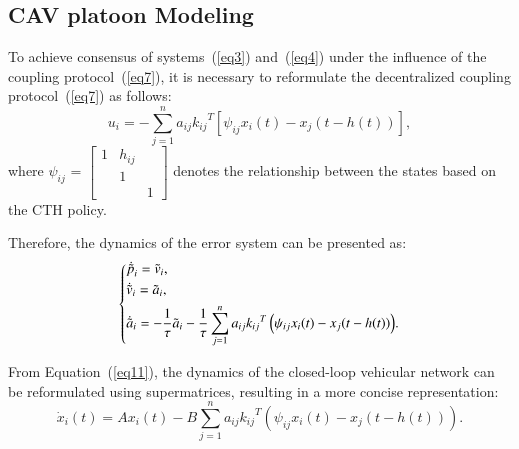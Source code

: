 \documentclass[journal]{IEEEtran}
\begin{document}
\subsection{CAV platoon Modeling}
\label{Section 3.2}

To achieve consensus of systems~(\ref{eq3}) and~(\ref{eq4}) under the influence of the coupling protocol~(\ref{eq7}), it is necessary to reformulate the decentralized coupling protocol~(\ref{eq7}) as follows:
\begin{equation}
  {u_i} =  - \sum\limits_{j = 1}^n {{a_{ij}}{k_{ij}}^T\left[ {{\psi _{ij}}{x_i}(t) - {x_j}(t - h(t))} \right]},
  \label{eq10}
\end{equation}
where $ {\psi _{ij}}{\text{ = }}\left[ {\begin{array}{*{20}{c}}
          1  & {{h_{ij}}} & {} \\
          {} & 1          & {} \\
          {} & {}         & 1
        \end{array}} \right] $ denotes the relationship between the states based on the CTH policy.

Therefore, the dynamics of the error system can be presented as:
\begin{equation}
  \left\{ \begin{gathered}
    {{\dot {\tilde p}}_i} = {{\tilde v}_i}, \hfill \\
    {{\dot {\tilde v}}_i} = {{\tilde a}_i}, \hfill\\
    {{\dot {\tilde a}}_i} =  - \frac{1}{\tau }{{\tilde a}_i} - \frac{1}{\tau }\sum\limits_{j = 1}^n {{a_{ij}}{k_{ij}}^T\left( {{\psi _{ij}}{x_i}(t) - {x_j}(t - h(t))} \right)}.  \hfill \\
  \end{gathered}  \right.
  \label{eq11}
\end{equation}

From Equation~(\ref{eq11}), the dynamics of the closed-loop vehicular network can be reformulated using supermatrices, resulting in a more concise representation:
\begin{equation}
  {\dot x_i}\left( t \right) = A{x_i}\left( t \right) - B\sum\limits_{j = 1}^n {{a_{ij}}{k_{ij}}^T\left( {{\psi _{ij}}{x_i}(t) - {x_j}(t - h(t))} \right)}.
  \label{eq12}
\end{equation}
\end{document}
